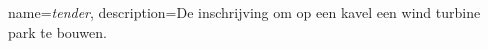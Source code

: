 \printglossaries
{}
{
    name=\textit{tender},
    description={De inschrijving om op een kavel een wind turbine park te bouwen.}
}
